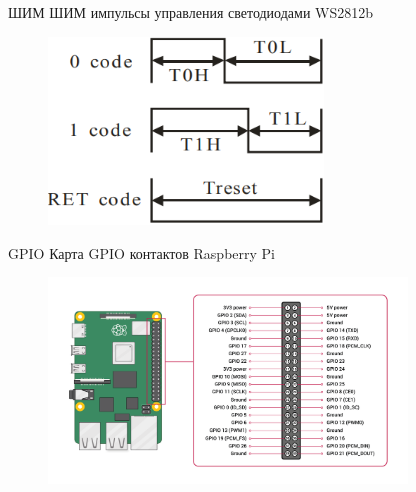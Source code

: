 \begin{frame}{ШИМ}
  ШИМ импульсы управления светодиодами WS2812b

  \begin{figure}[H]
    \centering
    \includegraphics[width=0.65\textwidth]{assets/images/PWM__codes.png}
    \label{img:pwm__codes}
  \end{figure}
\end{frame}

% 

\begin{frame}{GPIO}
  Карта GPIO контактов Raspberry Pi

  \begin{figure}[H]
    \centering
    \includegraphics[width=0.85\textwidth]{assets/images/GPIO-Pinout-Diagram.png}
  \end{figure}
\end{frame}